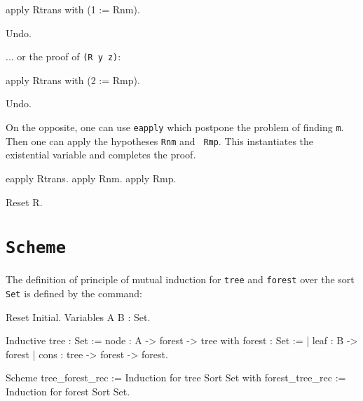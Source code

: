 \begin{coq_example*}
\begin{coq_example}

  apply Rtrans with (1 := Rnm).
\end{coq_example}

\begin{coq_eval}
Undo.
\end{coq_eval}

... or the proof of {\tt (R y z)}:

\begin{coq_example}

  apply Rtrans with (2 := Rmp).
\end{coq_example}

\begin{coq_eval}
Undo.
\end{coq_eval}

On the opposite, one can use {\tt eapply} which postpone the problem
of finding {\tt m}. Then one can apply the hypotheses {\tt Rnm} and {\tt
Rmp}. This instantiates the existential variable and completes the proof.

\begin{coq_example}

  eapply Rtrans.
apply Rnm.
apply Rmp.
\end{coq_example}

\begin{coq_eval}
Reset R.
\end{coq_eval}

\section{{\tt Scheme}}
\label{Scheme-examples}

\firstexample
{}

The definition of principle of mutual induction for {\tt tree} and
{\tt forest} over the sort {\tt Set} is defined by the command:

\begin{coq_eval}
Reset Initial.
Variables A B : 
              Set.
\end{coq_eval}

\begin{coq_example*}
Inductive tree : Set :=
    node : A -> forest -> tree
with forest : Set :=
  | leaf : B -> forest
  | cons : tree -> forest -> forest.

Scheme tree_forest_rec := Induction for tree
  Sort Set
  with forest_tree_rec := Induction for forest Sort Set.
\end{coq_example*}


\end{coq_example*}
